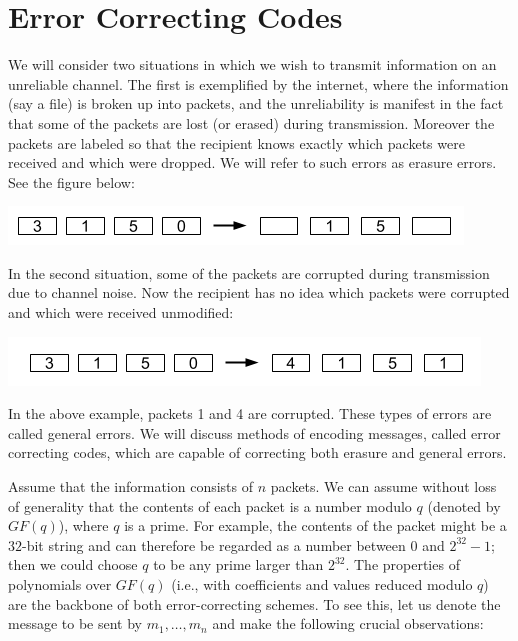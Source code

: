\documentclass[11pt,fleqn]{article}
\def\title{Note \the\lecturenumber}
\begin{document}
\maketitle

\section*{Error Correcting Codes}


We will consider two situations in which we wish to transmit
information on an unreliable channel. The first is exemplified by the
internet, where the information (say a file) is broken up into
packets, and the unreliability is manifest in the fact that some of
the packets are lost (or erased) during transmission. Moreover the 
packets are labeled so that the recipient knows exactly which 
packets were received and which were dropped. We will refer to such errors as erasure errors. 
See the figure below:

\includegraphics*[scale=0.70]{erasure.png}

In the second situation, some of the packets are
corrupted during transmission due to channel noise. Now the recipient has no idea which 
packets were corrupted and which were received unmodified:

\includegraphics*[scale=0.70]{general.png}

In the above example, packets 1 and 4 are corrupted. These types of errors are called general errors. We will discuss
methods of encoding messages, called error correcting codes, which are 
capable of correcting both erasure
and general errors.

Assume that the information consists of $n$ packets.
We can assume without loss of generality that the contents of each packet
is a number modulo $q$ (denoted by $GF(q)$), where $q$ is a prime. For example, the contents 
of the packet might be a $32$-bit string 
and can therefore be regarded as a number between $0$ and $2^{32} -1$;
then we could choose $q$ to be any prime larger than $2^{32}$.
The properties of polynomials over $GF(q)$ (i.e., with coefficients 
and values reduced modulo $q$) are the backbone of both error-correcting schemes. To see this, 
let us denote the
message to be sent by $m_1 , \ldots, m_n$ and make the following crucial observations:


\end{document}
\end{document}

